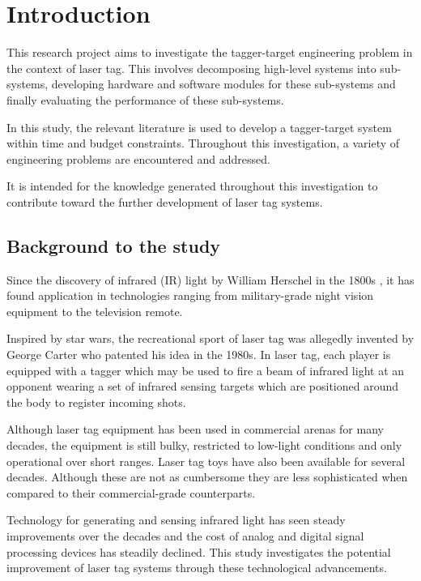 \chapter{Introduction}
\label{ch_introduction}

This research project aims to investigate the tagger-target engineering problem in the context of laser tag.  This involves decomposing high-level systems into sub-systems, developing hardware and software modules for these sub-systems and finally evaluating the performance of these sub-systems.

In this study, the relevant literature is used to develop a tagger-target system within time and budget constraints. Throughout this investigation, a variety of engineering problems are encountered and addressed.

It is intended for the knowledge generated throughout this investigation to contribute toward the further development of laser tag systems.

\section{Background to the study}
Since the discovery of infrared (IR) light by William Herschel in the 1800s \cite{Rowan-Robinson2013}, it has found application in technologies ranging from military-grade night vision equipment to the television remote.

Inspired by star wars, the recreational sport of laser tag was allegedly invented by George Carter who patented his idea in the 1980s\cite{Carter1986}. In laser tag, each player is equipped with a tagger which may be used to fire a beam of infrared light at an opponent wearing a set of infrared sensing targets which are positioned around the body to register incoming shots.

Although laser tag equipment has been used in commercial arenas for many decades, the equipment is still bulky, restricted to low-light conditions and only operational over short ranges. Laser tag toys have also been available for several decades. Although these are not as cumbersome they are less sophisticated when compared to their commercial-grade counterparts.

Technology for generating and sensing infrared light has seen steady improvements over the decades and the cost of analog and digital signal processing devices has steadily declined. This study investigates the potential improvement of laser tag systems through these technological advancements.

